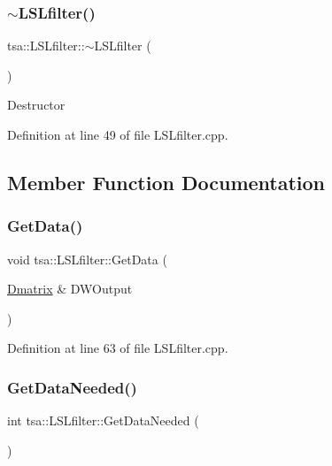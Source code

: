 \subsubsection{\texorpdfstring{$\sim$\+L\+S\+Lfilter()}{~LSLfilter()}}
{\footnotesize\ttfamily tsa\+::\+L\+S\+Lfilter\+::$\sim$\+L\+S\+Lfilter (\begin{DoxyParamCaption}{ }\end{DoxyParamCaption})}

Destructor 

Definition at line 49 of file L\+S\+Lfilter.\+cpp.



\subsection{Member Function Documentation}
\mbox{\label{classtsa_1_1_l_s_lfilter_ad577b856b131f49de4e29eb2406560e9}} 
\subsubsection{\texorpdfstring{Get\+Data()}{GetData()}}
{\footnotesize\ttfamily void tsa\+::\+L\+S\+Lfilter\+::\+Get\+Data (\begin{DoxyParamCaption}\item[{\hyperlink{namespacetsa_ad260cd21c1891c4ed391fe788569aba4}{Dmatrix} \&}]{D\+W\+Output }\end{DoxyParamCaption})}



Definition at line 63 of file L\+S\+Lfilter.\+cpp.

\mbox{\label{classtsa_1_1_l_s_lfilter_a236a35327bce862b6c4f8a9245af7b9c}} 
\subsubsection{\texorpdfstring{Get\+Data\+Needed()}{GetDataNeeded()}}
{\footnotesize\ttfamily int tsa\+::\+L\+S\+Lfilter\+::\+Get\+Data\+Needed (\begin{DoxyParamCaption}{ }\end{DoxyParamCaption})}

